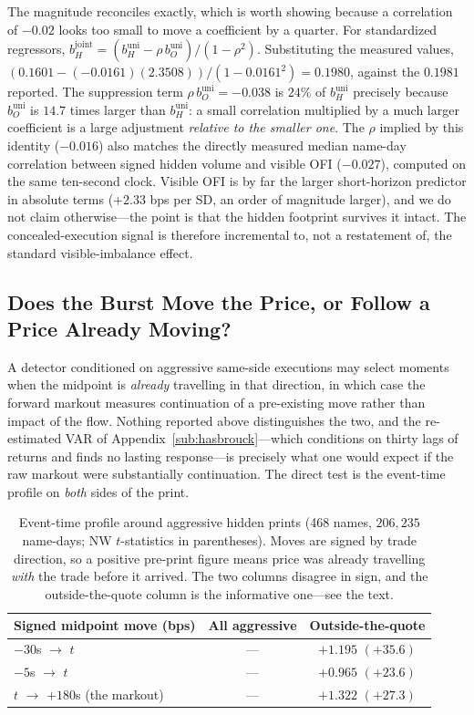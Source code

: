 \documentclass[11pt]{article}
\begin{document}
The magnitude reconciles exactly, which is worth showing because a correlation of $-0.02$
looks too small to move a coefficient by a quarter. For standardized regressors,
$b_H^{\text{joint}} = (b_H^{\text{uni}} - \rho\, b_O^{\text{uni}})/(1-\rho^2)$. Substituting
the measured values, $(0.1601 - (-0.0161)(2.3508))/(1-0.0161^2) = 0.1980$, against the
$0.1981$ reported. The suppression term $\rho\, b_O^{\text{uni}} = -0.038$ is $24\%$ of
$b_H^{\text{uni}}$ precisely because $b_O^{\text{uni}}$ is $14.7$ times larger than
$b_H^{\text{uni}}$: a small correlation multiplied by a much larger coefficient is a large
adjustment \emph{relative to the smaller one}. The $\rho$ implied by this identity
($-0.016$) also matches the directly measured median name-day correlation between signed
hidden volume and visible OFI ($-0.027$), computed on the same ten-second clock. Visible OFI is by far the larger short-horizon
predictor in absolute terms ($+2.33$ bps per SD, an order of magnitude larger), and we do
not claim otherwise---the point is that the hidden footprint survives it intact. The
concealed-execution signal is therefore incremental to, not a restatement of, the standard
visible-imbalance effect.

\subsection{Does the Burst Move the Price, or Follow a Price Already Moving?}
\label{sub:preprint}

A detector conditioned on aggressive same-side executions may select moments when the
midpoint is \emph{already} travelling in that direction, in which case the forward markout
measures continuation of a pre-existing move rather than impact of the flow. Nothing
reported above distinguishes the two, and the re-estimated VAR of
Appendix~\ref{sub:hasbrouck}---which conditions on thirty lags of returns and finds no
lasting response---is precisely what one would expect if the raw markout were substantially
continuation. The direct test is the event-time profile on \emph{both} sides of the print.

\begin{table}[htbp]
\centering
\begin{tabular}{lcc}
\toprule
\textbf{Signed midpoint move (bps)} & \textbf{All aggressive} & \textbf{Outside-the-quote} \\
\midrule
$-30$s $\rightarrow$ $t$ & --- & $+1.195$ $(+35.6)$ \\
$-5$s $\rightarrow$ $t$ & --- & $+0.965$ $(+23.6)$ \\
\midrule
$t$ $\rightarrow$ $+180$s (the markout) & --- & $+1.322$ $(+27.3)$ \\
\bottomrule
\end{tabular}
\caption{Event-time profile around aggressive hidden prints (468 names, $206{,}235$
name-days; NW $t$-statistics in parentheses). Moves are signed by trade direction, so a
positive pre-print figure means price was already travelling \emph{with} the trade before it
arrived. The two columns disagree in sign, and the outside-the-quote column is the
informative one---see the text.}
\label{tab:preprint}
\end{table}
\end{document}
